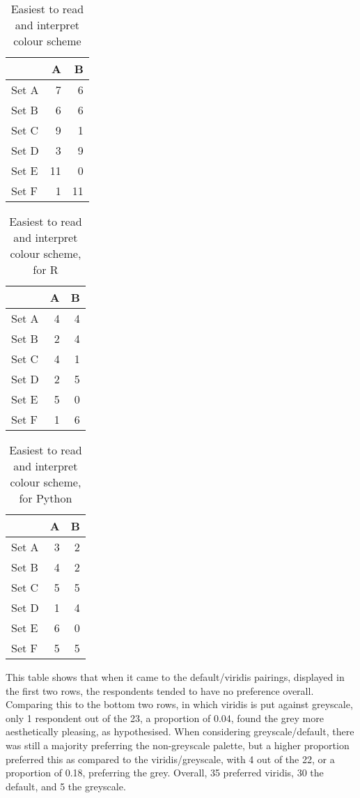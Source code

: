 \documentclass[
]{article}
\begin{document}
\begin{table}[!h]

\caption{\label{tab:unnamed-chunk-51}Easiest to read and interpret colour scheme}
\centering
\begin{tabular}[t]{l|r|r}
\hline
  & A & B\\
\hline
Set A & 7 & 6\\
\hline
Set B & 6 & 6\\
\hline
Set C & 9 & 1\\
\hline
Set D & 3 & 9\\
\hline
Set E & 11 & 0\\
\hline
Set F & 1 & 11\\
\hline
\end{tabular}
\end{table}

\begin{table}[!h]

\caption{\label{tab:unnamed-chunk-51}Easiest to read and interpret colour scheme, for R}
\centering
\begin{tabular}[t]{l|r|r}
\hline
  & A & B\\
\hline
Set A & 4 & 4\\
\hline
Set B & 2 & 4\\
\hline
Set C & 4 & 1\\
\hline
Set D & 2 & 5\\
\hline
Set E & 5 & 0\\
\hline
Set F & 1 & 6\\
\hline
\end{tabular}
\end{table}

\begin{table}[!h]

\caption{\label{tab:unnamed-chunk-51}Easiest to read and interpret colour scheme, for Python}
\centering
\begin{tabular}[t]{l|r|r}
\hline
  & A & B\\
\hline
Set A & 3 & 2\\
\hline
Set B & 4 & 2\\
\hline
Set C & 5 & 5\\
\hline
Set D & 1 & 4\\
\hline
Set E & 6 & 0\\
\hline
Set F & 5 & 5\\
\hline
\end{tabular}
\end{table}

This table shows that when it came to the default/viridis pairings,
displayed in the first two rows, the respondents tended to have no
preference overall. Comparing this to the bottom two rows, in which
viridis is put against greyscale, only 1 respondent out of the 23, a
proportion of 0.04, found the grey more aesthetically pleasing, as
hypothesised. When considering greyscale/default, there was still a
majority preferring the non-greyscale palette, but a higher proportion
preferred this as compared to the viridis/greyscale, with 4 out of the
22, or a proportion of 0.18, preferring the grey. Overall, 35 preferred
viridis, 30 the default, and 5 the greyscale.
\end{document}
